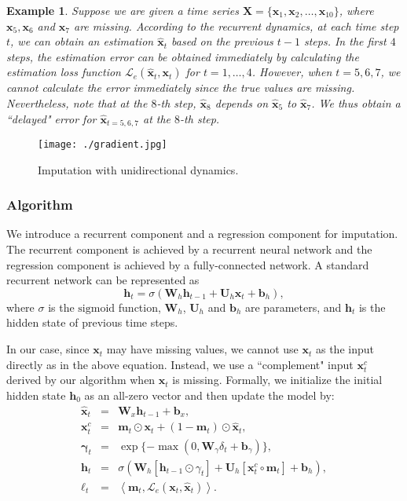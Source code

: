 \documentclass{article}
\newtheorem{example}{Example}
\newcommand{\x}{{\mathbf x}}
\newcommand{\h}{{\mathbf h}}
\newcommand{\m}{{\mathbf m}}
\newcommand{\bias}{{\mathbf b}}
\newcommand{\X}{{\mathbf X}}
\newcommand{\W}{{\mathbf W}}
\newcommand{\Ux}{{\mathbf U}}
\begin{document}
\begin{example}
\label{example:forward}
Suppose we are given a time series $\X = \{\x_1, \x_2, \ldots, \x_{10}\}$, where $\x_5, \x_6$ and $\x_7$ are missing.  According to the recurrent dynamics, at each time step $t$, we can  obtain an estimation $\hat{\x}_t$ based on  the previous $t -1$ steps. In the first $4$ steps, the estimation error can be obtained immediately by calculating the estimation loss function $\mathcal{L}_e(\hat{\x}_t, \x_t)$ for $t = 1, \ldots, 4$. However, when $t = 5, 6, 7$, we cannot calculate the error immediately since the true values are missing. Nevertheless, note that  at the $8$-th step, $\hat{\x}_8$ depends on $\hat{\x}_5$ to $\hat{\x}_7$. We thus obtain a ``delayed" error for $\hat{\x}_{t = 5, 6, 7}$ at the $8$-th step.
\end{example}


\begin{figure}[t!]
\centering
\texttt{[image: ./gradient.jpg]}
\caption{Imputation with unidirectional dynamics.}
\label{fig:backpropagate}
\end{figure}



\subsubsection{Algorithm}
We introduce a recurrent component and a regression component for imputation. The recurrent component is achieved by a recurrent neural network and the regression component is achieved by a fully-connected network.
A standard recurrent network \cite{DeepBook} can be represented as 
\begin{equation*}
\label{equ:standard_rnn}
\h_t = \sigma(\mathbf{W}_h\h_{t - 1} + \Ux_h \x_t + \bias_h),
\end{equation*}
where $\sigma$ is the $\mathrm{sigmoid}$ function, $\W_h$, $\Ux_h$ and $\bias_h$ are parameters, and $\h_t$ is the hidden state of previous time steps.

In our case, since $\x_t$ may have missing values, we cannot use $\x_t$ as the input directly as in the above equation. Instead,  we use a ``complement" input $\x_t^c$ derived by our algorithm when $\x_t$ is missing. Formally,
we  initialize the initial hidden state $\h_0$ as an all-zero vector and then update the model by: 
\begin{eqnarray}
\hat{\x}_t &=& \W_x \h_{t - 1} +  \bias_x, \label{eq1}\\
{\x_t^c} &=& \m_t \odot \x_t + (1 - \m_t) \odot \hat{\x}_t, \label{eq2}\\
\mathbf{\gamma}_t &=&  \exp\{-\max(0, \W_{\gamma} \delta_{t} + \bias_{\gamma})\},  \label{eq4}\\
\h_t &=& \sigma(\W_h [\h_{t - 1} \odot \gamma_t] + \Ux_h [{\x_t^c} \circ \m_t] + \bias_h), \label{eq3}\\
\mathbb{\ell}_t &=& \left< \m_t, \mathcal{L}_e(\x_t, \hat{\x}_t) \right>. \label{eq5}
\end{eqnarray}
\end{document}
